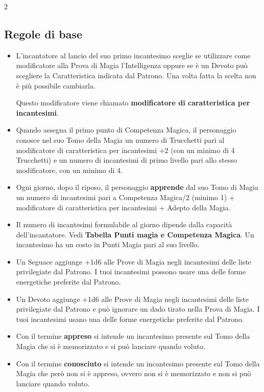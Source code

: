 \begin{multicols}{2}

\subsection{Regole di base}\label{magieregoledibase}

\begin{itemize}[leftmargin=*] \setlength{\itemsep}{0pt}

\item
L'incantatore al lancio del suo primo incantesimo sceglie se utilizzare come modificatore alla Prova di Magia l'Intelligenza oppure se è un Devoto può scegliere la Caratteristica indicata dal Patrono. Una volta fatta la scelta non è più possibile cambiarla.

Questo modificatore viene chiamato \textbf{modificatore di caratteristica per incantesimi}.
\item
Quando assegna il primo punto di Competenza Magica, il personaggio conosce nel suo Tomo della Magia un numero di Trucchetti pari al modificatore di caratteristica per incantesimi +2 (con un minimo di 4 Trucchetti) e un numero di incantesimi di primo livello pari allo stesso modificatore, con un minimo di 4.
\item
Ogni giorno, dopo il riposo, il personaggio \textbf{apprende} dal suo Tomo di Magia un numero di incantesimi pari a Competenza Magica/2 (minimo 1) + modificatore di caratteristica per incantesimi + Adepto della Magia.\label{incantesimicm1}\hypertarget{incantesimicm1}{}
\item
Il numero di incantesimi formulabile al giorno dipende dalla capacità dell'incantatore. Vedi \textbf{Tabella Punti magia e Competenza Magica}. Un incantesimo ha un costo in Punti Magia pari al suo livello.
\item
Un Seguace aggiunge +1d6 alle Prove di Magia negli incantesimi delle liste privilegiate dal Patrono. I tuoi incantesimi possono usare una delle forme energetiche preferite dal Patrono.\label{listeprivilegiate}\hypertarget{listeprivilegiate}{}
\item
Un Devoto aggiunge +1d6 alle Prove di Magia negli incantesimi delle liste privilegiate dal Patrono e può ignorare un dado tirato nella Prova di Magia. I tuoi incantesimi usano una delle forme energetiche preferite dal Patrono.
\item
Con il termine \textbf{appreso} si intende un incantesimo presente sul Tomo della Magia che si è memorizzato e si può lanciare quando voluto.
\item
Con il termine \textbf{conosciuto} si intende un incantesimo presente sul Tomo della Magia che però non si è appreso, ovvero non si è memorizzato e non si può lanciare quando voluto.
\end{itemize}


\end{multicols}
